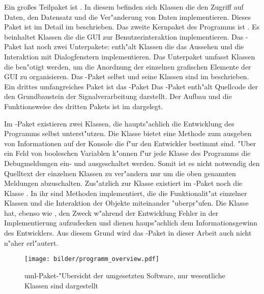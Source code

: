 Ein gro{\ss}es Teilpaket ist .
In diesem befinden sich Klassen die den Zugriff auf Daten, den Datensatz und die Ver"anderung von Daten implementieren.
Dieses Paket ist im Detail im  beschrieben.
Das zweite Kernpaket des Programms ist .
Es beinhaltet Klassen die die \ac{GUI} zur Benutzerinteraktion implementieren.
Das -Paket hat noch zwei Unterpakete:
 enth"alt Klassen die das Aussehen und die Interaktion mit Dialogfenstern implementieren.
Das Unterpaket  umfasst Klassen die ben"otigt werden, um die Anordnung der einzelnen grafischen Elemente der \ac{GUI} zu organisieren.
Das -Paket selbst und seine Klassen sind im  beschrieben.
Ein drittes umfangreiches Paket ist das -Paket
Das -Paket enth"alt Quellcode der den Grundbaustein der Signalverarbeitung darstellt.
Der Aufbau und die Funktionsweise des dritten Pakets ist im  dargelegt.

Im -Paket existieren zwei Klassen, die haupts"achlich die Entwicklung des Programms selbst unterst"utzen.
Die Klasse  bietet eine Methode zum ausgeben von Informationen auf der Konsole die f"ur den Entwickler bestimmt sind.
"Uber ein Feld von booleschen Variablen k"onnen f"ur jede Klasse des Programms die Debugmeldungen ein- und ausgeschaltet werden.
Somit ist es nicht notwendig den Quelltext der einzelnen Klassen zu ver"andern nur um die oben genannten Meldungen abzuschalten.
Zus"atzlich zur Klasse  existiert im -Paket noch die Klasse .
In ihr sind Methoden implementiert, die die Funktionalit"at einzelner Klassen und die Interaktion der Objekte miteinander "uberpr"ufen.
Die  Klasse hat, ebenso wie , den Zweck w"ahrend der Entwicklung Fehler in der Implementierung aufzudecken und dienen haups"achlich dem Informationsgewinn des Entwicklers.
Aus diesem Grund wird das -Paket in dieser Arbeit auch nicht n"aher erl"autert.

\begin{figure}[htb]
\centering
\texttt{[image: bilder/programm\_overview.pdf]}
\caption[\acs{uml}-Paket-"Ubersicht der umgesetzten Software]{\ac{uml}-Paket-"Ubersicht der umgesetzten Software, nur wesentliche Klassen sind dargestellt}
\label{pic:paket_ubersicht}
\end{figure}


